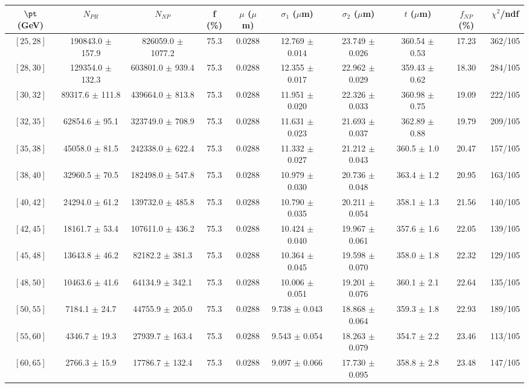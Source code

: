 \begin{tabular}{c||c|c|c|c|c|c|c||c|c}
$\pt$ (GeV) & $N_{PR}$ & $N_{NP}$ & f (\%) & $\mu$ ($\mu$m) & $\sigma_1$ ($\mu$m) & $\sigma_2$ ($\mu$m)  & $t$ ($\mu$m) & $f_{NP}$ (\%) & $\chi^2$/ndf \\
\hline
$[25, 28]$ & 190843.0 $\pm$ 157.9 & 826059.0 $\pm$ 1077.2 & 75.3 & 0.0288 & 12.769 $\pm$ 0.014 & 23.749 $\pm$ 0.026 & 360.54 $\pm$ 0.53 & 17.23 & 362/105\\
$[28, 30]$ & 129354.0 $\pm$ 132.3 & 603801.0 $\pm$ 939.4 & 75.3 & 0.0288 & 12.355 $\pm$ 0.017 & 22.962 $\pm$ 0.029 & 359.43 $\pm$ 0.62 & 18.30 & 284/105\\
$[30, 32]$ & 89317.6 $\pm$ 111.8 & 439664.0 $\pm$ 813.8 & 75.3 & 0.0288 & 11.951 $\pm$ 0.020 & 22.326 $\pm$ 0.033 & 360.98 $\pm$ 0.75 & 19.09 & 222/105\\
$[32, 35]$ & 62854.6 $\pm$ 95.1 & 323749.0 $\pm$ 708.9 & 75.3 & 0.0288 & 11.631 $\pm$ 0.023 & 21.693 $\pm$ 0.037 & 362.89 $\pm$ 0.88 & 19.79 & 209/105\\
$[35, 38]$ & 45058.0 $\pm$ 81.5 & 242338.0 $\pm$ 622.4 & 75.3 & 0.0288 & 11.332 $\pm$ 0.027 & 21.212 $\pm$ 0.043 & 360.5 $\pm$ 1.0 & 20.47 & 157/105\\
$[38, 40]$ & 32960.5 $\pm$ 70.5 & 182498.0 $\pm$ 547.8 & 75.3 & 0.0288 & 10.979 $\pm$ 0.030 & 20.736 $\pm$ 0.048 & 363.4 $\pm$ 1.2 & 20.95 & 163/105\\
$[40, 42]$ & 24294.0 $\pm$ 61.2 & 139732.0 $\pm$ 485.8 & 75.3 & 0.0288 & 10.790 $\pm$ 0.035 & 20.211 $\pm$ 0.054 & 358.1 $\pm$ 1.3 & 21.56 & 140/105\\
$[42, 45]$ & 18161.7 $\pm$ 53.4 & 107611.0 $\pm$ 436.2 & 75.3 & 0.0288 & 10.424 $\pm$ 0.040 & 19.967 $\pm$ 0.061 & 357.6 $\pm$ 1.6 & 22.05 & 139/105\\
$[45, 48]$ & 13643.8 $\pm$ 46.2 & 82182.2 $\pm$ 381.3 & 75.3 & 0.0288 & 10.364 $\pm$ 0.045 & 19.598 $\pm$ 0.070 & 358.0 $\pm$ 1.8 & 22.32 & 129/105\\
$[48, 50]$ & 10463.6 $\pm$ 41.6 & 64134.9 $\pm$ 342.1 & 75.3 & 0.0288 & 10.006 $\pm$ 0.051 & 19.201 $\pm$ 0.076 & 360.1 $\pm$ 2.1 & 22.64 & 135/105\\
$[50, 55]$ & 7184.1 $\pm$ 24.7 & 44755.9 $\pm$ 205.0 & 75.3 & 0.0288 & 9.738 $\pm$ 0.043 & 18.868 $\pm$ 0.064 & 359.3 $\pm$ 1.8 & 22.93 & 189/105\\
$[55, 60]$ & 4346.7 $\pm$ 19.3 & 27939.7 $\pm$ 163.4 & 75.3 & 0.0288 & 9.543 $\pm$ 0.054 & 18.263 $\pm$ 0.079 & 354.7 $\pm$ 2.2 & 23.46 & 113/105\\
$[60, 65]$ & 2766.3 $\pm$ 15.9 & 17786.7 $\pm$ 132.4 & 75.3 & 0.0288 & 9.097 $\pm$ 0.066 & 17.730 $\pm$ 0.095 & 358.8 $\pm$ 2.8 & 23.48 & 147/105\\

\end{tabular}
